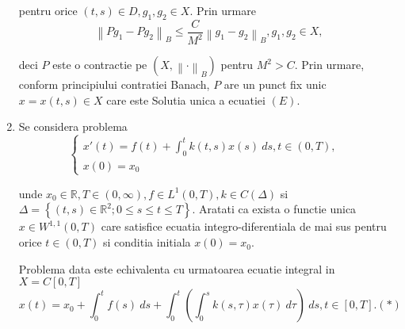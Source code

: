 \documentclass[a4paper,12pt,oneside]{report}
\begin{document}
\begin{enumerate}
		      			      			      			      			      	
		      	pentru orice \(\left ( t,s \right )\in D, g_{1}, g_{2} \in X\). Prin urmare 
		      	\begin{displaymath}
		      		\left \| Pg_{1} - Pg_{2} \right \|_{B} \leq \frac{C}{M^{2}}\left \| g_{1} - g_{2} \right \|_{B}, g_{1}, g_{2}\in X, 
		      	\end{displaymath}
		      			      			      			      			      	
		      	deci \(P\) este o contractie pe \(\left ( X, \left \| \cdot  \right \|_{B} \right )\) pentru \(M^{2} > C\). Prin urmare, conform principiului contratiei Banach, \(P\) are un punct fix unic \(x = x\left ( t,s \right )\in X\) care este Solutia unica a ecuatiei \((E)\).  
		      			      			      			      			      	        
		      	\item Se considera problema 
		      	\begin{displaymath}
		      		\left\{\begin{matrix}
		      		{x}'\left ( t \right ) = f\left ( t \right ) + \int_{0}^{t}k\left ( t,s \right )x\left ( s \right ) \ ds , t\in \left ( 0,T \right ), 
		      		& \\ x\left ( 0 \right ) = x_{0}     
		      		\end{matrix}\right.
		      	\end{displaymath}
		      			      			      			      	
		      	unde \(x_{0} \in \mathbb{R} , T \in \left ( 0,\infty  \right ), f\in L^{1}\left ( 0,T \right ) , k\in C\left ( \Delta  \right )\) si \(\Delta = \left \{ \left ( t,s \right ) \in \mathbb{R}^{2}; 0\leq s\leq t\leq T \right \}\). 
		      	Aratati ca exista o functie unica \(x \in W^{1,1}\left ( 0,T \right )\) care satisfice ecuatia integro-diferentiala de mai sus pentru orice \(t \in \left ( 0,T \right )\) si conditia initiala \(x\left ( 0 \right ) = x_{0}\). 
		      			      			      			      	
		      			      			      			      	
		      	Problema data este echivalenta cu urmatoarea ecuatie integral in \(X = C\left [ 0, T \right ]\)
		      	\begin{displaymath}
		      		x\left ( t \right ) = x_{0} + \int_{0}^{t}f\left ( s \right )\ ds + \int_{0}^{t}\left ( \int_{0}^{s} k\left ( s,\tau  \right )x\left ( \tau  \right ) \ d\tau \right )\ ds, t \in \left [ 0, T \right ]. (*)
		      	\end{displaymath}
		      			      			      			      	

\end{enumerate}
\end{document}
